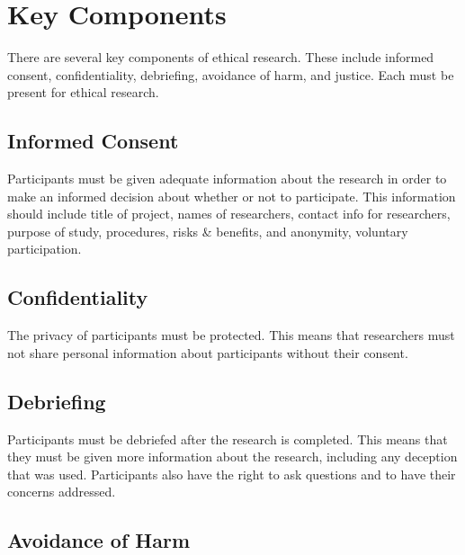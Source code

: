 \documentclass[
  b5paper]{book}
\begin{document}
\hypertarget{key-components}{%
\section{Key Components}\label{key-components}}

There are several key components of ethical research. These include informed consent, confidentiality, debriefing, avoidance of harm, and justice. Each must be present for ethical research.

\hypertarget{informed-consent}{%
\subsection*{Informed Consent}\label{informed-consent}}

Participants must be given adequate information about the research in order to make an informed decision about whether or not to participate. This information should include title of project, names of researchers, contact info for researchers, purpose of study, procedures, risks \& benefits, and anonymity, voluntary participation.

\hypertarget{confidentiality}{%
\subsection*{Confidentiality}\label{confidentiality}}

The privacy of participants must be protected. This means that researchers must not share personal information about participants without their consent.

\hypertarget{debriefing}{%
\subsection*{Debriefing}\label{debriefing}}

Participants must be debriefed after the research is completed. This means that they must be given more information about the research, including any deception that was used. Participants also have the right to ask questions and to have their concerns addressed.

\hypertarget{avoidance-of-harm}{%
\subsection*{Avoidance of Harm}\label{avoidance-of-harm}}
\end{document}
